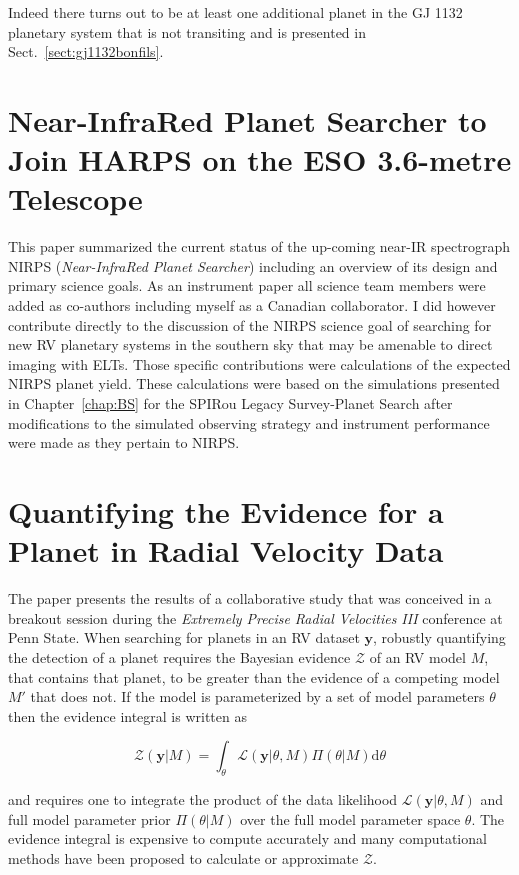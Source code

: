 Indeed there turns out to be at least one additional planet in the GJ 1132
planetary system
that is not transiting and is presented in Sect.~\ref{sect:gj1132bonfils}.

\section{Near-InfraRed Planet Searcher to Join HARPS on the ESO 3.6-metre
  Telescope \citep{bouchy17}}
This paper summarized the current status of the up-coming near-IR spectrograph
NIRPS (\emph{Near-InfraRed Planet Searcher}) including an overview of its design
and primary science goals. As an instrument paper all science team members were
added as co-authors including myself as a Canadian collaborator. I did however
contribute directly to the discussion of the NIRPS science goal of searching
for new RV planetary systems in the southern sky that may be amenable to direct
imaging with ELTs. Those specific contributions were calculations of the
expected NIRPS planet yield. These calculations were based on the simulations
presented in Chapter~\ref{chap:BS} for the
SPIRou Legacy Survey-Planet Search after modifications to the simulated
observing strategy and instrument performance were made as they pertain to
NIRPS.


\section[Radial velocity planet evidence]{Quantifying the Evidence for a Planet in Radial Velocity Data
  \citep{nelson18}}
The paper presents the results of a collaborative study that was conceived in
a breakout session during the \emph{Extremely Precise Radial Velocities III}
conference at Penn State. When searching for planets in an RV dataset
$\mathbf{y}$, robustly 
quantifying the detection of a planet requires the Bayesian evidence
$\mathcal{Z}$ of an RV model $M$, that contains that planet, to
be greater than the evidence of a competing model $M'$ that does not. If the
model is parameterized by a set of model parameters $\theta$ then
the evidence integral is written as

\begin{equation}
  \mathcal{Z}(\mathbf{y}|M) = \int_{\theta} \mathcal{L}(\mathbf{y}|\theta,M)
  \Pi(\theta|M) \text{d} \theta
\end{equation}

\noindent and requires one to integrate the product of the data likelihood
$\mathcal{L}(\mathbf{y}|\theta,M)$ and full model parameter prior
$\Pi(\theta|M)$ over the full model parameter space $\theta$.
The evidence integral is expensive to compute accurately and many computational
methods have been proposed to calculate or approximate $\mathcal{Z}$. \\

